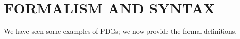 \documentclass{article}
\newcommand{\commentout}[1]{\ignorespaces}
\newcommand{\MN}{PDG}
\newcommand{\MNs}{\MN s}
\numberwithin{equation}{section}
\begin{document}
	
	
	\section{FORMALISM AND SYNTAX}\label{sec:formal+syntax}
	
	We have seen some examples of \MNs; we now provide the formal definitions.
	\commentout{Compared to a Bayesian Network, a \MN\ still consists of a directed graph, and the edges still inform conditional probability tables, but now each edge is interpreted individually. Consider the graph
	\[ A \!\rightarrow\! C \!\leftarrow\! B,\]
	which would be interpreted as three tables $\Pr(C\mid A, B), \Pr(A), \Pr(B)$ in a BN. Interpreting it as a \MNs, there are no distributions on $A$ or $B$, and the arrows into $C$ would be split into two separate tables $\Pr(C \mid A)$ and $\Pr(B \mid A)$, rather than a joint one. }
\end{document}
